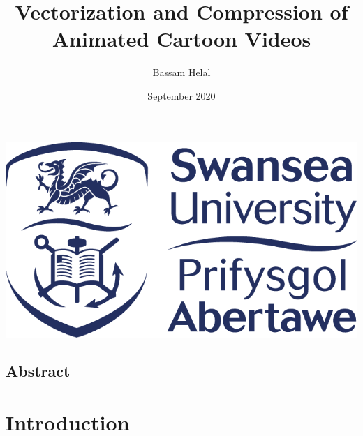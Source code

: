 \documentclass[12pt]{article}
\title{Vectorization and Compression of Animated Cartoon Videos}
\author{Bassam Helal}
\date{September 2020}
\newcommand{\black}{
\pagecolor{black}
\color{white}
}
\begin{document}
    \black


    \maketitle

    \begin{center}
        \vspace{8cm}
        \includegraphics[scale=0.65]{SwanseaUniversityLogo.png}
    \end{center}

    \pagebreak

    \begin{center}
        \section*{Abstract}
    \end{center}


    \pagebreak

    \renewcommand*\contentsname{
    \begin{center}
        Table of Contents
    \end{center}}

    \tableofcontents

    \pagebreak



    \section{Introduction}\label{sec:introduction}
\end{document}
